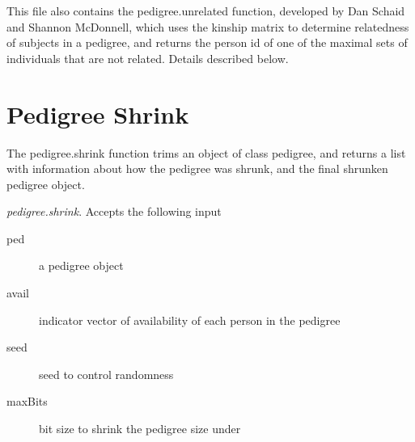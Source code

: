 \documentclass{article}
\begin{document}
This file also contains the pedigree.unrelated function, developed by Dan 
Schaid and Shannon McDonnell, which uses the kinship matrix to 
determine relatedness of subjects in a pedigree, and returns the person id
of one of the maximal sets of individuals that are not related. 
Details described below.


\section{Pedigree Shrink}
The pedigree.shrink function trims an object of class pedigree, and 
returns a list with information about how the pedigree was shrunk, 
and the final shrunken pedigree object.

\emph{pedigree.shrink}.  
Accepts the following input
\begin{description}
  \item[ped] a pedigree object
  \item[avail] indicator vector of availability of each person in the pedigree
  \item[seed] seed to control randomness
  \item[maxBits] bit size to shrink the pedigree size under
\end{description}
\end{document}
